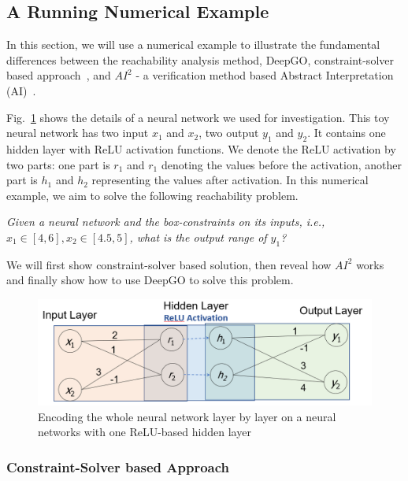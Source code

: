 
\subsection{A Running Numerical Example}

In this section, we will use a numerical example to illustrate the fundamental differences between the reachability analysis method, DeepGO, constraint-solver based approach~\cite{bunel2017piecewise,CNR2017,ehlers2017formal1}, and $AI^2$ - a verification method based Abstract Interpretation (AI)~\cite{gehr2018ai21}.

Fig.~\ref{fig-E2} shows the details of a neural network we used for investigation. This toy neural network has two input $x_1$ and $x_2$, two output $y_1$ and $y_2$. It contains one hidden layer with ReLU activation functions. We denote the ReLU activation by two parts: one part is $r_1$ and $r_1$ denoting the values before the activation, another part is $h_1$ and $h_2$ representing the values after activation. In this numerical example, we aim to solve the following reachability problem.

\begin{problem}\label{problem-E1}
{\em Given a neural network and the box-constraints on its inputs, i.e., $x_1\in [4,6], x_2 \in [4.5,5]$, what is the output range of $y_1$?}
\end{problem}

We will first show constraint-solver based solution, then reveal how $AI^2$ works and finally show how to use DeepGO to solve this problem.
 
\begin{figure}[t]
	\centering
	\includegraphics[width=0.85\linewidth]{images/robustnessVerification/Capture5.PNG}
	\caption{Encoding the whole neural network layer by layer on a neural networks with one ReLU-based hidden layer}
	\label{fig-E2}
\end{figure}
  
\subsubsection{Constraint-Solver based Approach}

